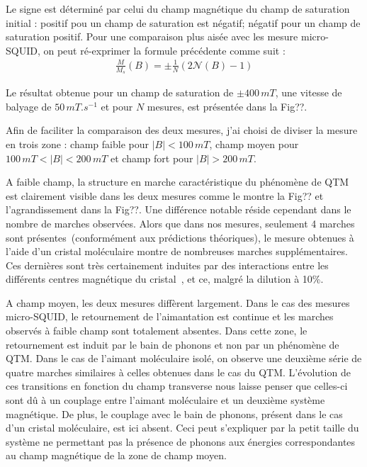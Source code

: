 Le signe est déterminé par celui du champ magnétique du champ de saturation initial : positif pou un champ de saturation est négatif; négatif pour un champ de saturation positif. Pour une comparaison plus aisée avec les mesure micro-SQUID, on peut ré-exprimer la formule précédente comme suit :
\begin{eqnarray}
\frac{M}{M_s}(B) =\pm \frac{1}{N} (2\mathscr{N}(B) -1)
\end{eqnarray}

Le résultat obtenue pour un champ de saturation de $\pm 400 \, mT$, une vitesse de balyage de $50\,mT.s^{-1}$ et pour $N$ mesures, est présentée dans la Fig??.

Afin de faciliter la comparaison des deux mesures, j'ai choisi de diviser la mesure en trois zone : champ faible pour $|B|< 100\,mT$, champ moyen pour $100\,mT<|B|< 200\,mT$ et champ fort pour $|B| > 200\,mT$.

A faible champ, la structure en marche caractéristique du phénomène de QTM~\cite{Thomas1996,Friedman1996} est clairement visible dans les deux mesures comme le montre la Fig?? et l'agrandissement dans la Fig??. Une différence notable réside cependant dans le nombre de marches observées. Alors que dans nos mesures, seulement 4 marches sont présentes~(conformément aux prédictions théoriques), le mesure obtenues à l'aide d'un cristal moléculaire montre de nombreuses marches supplémentaires. Ces dernières sont très certainement induites par des interactions entre les différents centres magnétique du cristal~\cite{Wernsdorfer2002}, et ce, malgré la dilution à 10\%.

A champ moyen, les deux mesures diffèrent largement. Dans le cas des mesures micro-SQUID, le retournement de l'aimantation est continue et les marches observés à faible champ sont totalement absentes. Dans cette zone, le retournement est induit par le bain de phonons et non par un phénomène de QTM. Dans le cas de l'aimant moléculaire isolé, on observe une deuxième série de quatre marches similaires à celles obtenues dans le cas du QTM. L'évolution de ces transitions en fonction du champ transverse nous laisse penser que celles-ci sont d\^u à un couplage entre l'aimant moléculaire et un deuxième système magnétique. De plus, le couplage avec le bain de phonons, présent dans le cas d'un cristal moléculaire, est ici absent. Ceci peut s'expliquer par la petit taille du système ne permettant pas la présence de phonons aux énergies correspondantes au champ magnétique de la zone de champ moyen.

